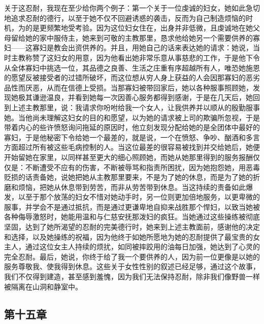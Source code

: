 \par

关于这忍耐，我现在至少给你两个例子：第一个关于一位虔诚的妇女，她如此急切地追求忍耐的德行，以至于她不仅不回避诱惑的袭击，反而为自己制造烦恼的时机，为的是更频繁地受考验。因为这位妇女住在，出身并非低微，且虔诚地在她父母留给她的家中服侍主，她来到可敬的主教那里，恳求他给她另一个需要供养的寡妇——这寡妇是教会出资供养的。并且，用她自己的话来表达她的请求：她说，当时主教称赞了这妇女的用意，因为他看出她非常乐意从事慈悲的工作，于是他下令从全体寡妇中挑选一位，其品德之良善、生活之庄重有序超越所有人，唯恐她施恩的愿望反被接受者的过错所破坏，而这位想从穷人身上获益的人会因那寡妇的恶劣品性而厌恶，从而在信德上受损。当那寡妇被带回家后，她以各种服事照顾她，发现她极其谦逊温良，并看到她每一次因善心服务都得到感谢，于是在几天后，她回到上述主教那里，说：我请求你吩咐给我一个女人，让我供养并以顺从的殷勤服事她。当他尚未理解这妇女的目的和愿望，以为她的请求被上司的欺骗所忽视，于是带着内心的些许愤怒询问拖延的原因时，他立刻发现分配给她的是全团体中最好的寡妇，于是他秘密下令给她一个最差的，就是说，一个在愤怒、争吵、酗酒和多言方面超过所有被这些毛病控制的人。当这位最差的很容易被找到并交给她后，她便开始留她在家里，以同样甚至更大的细心照顾她，而她从她那里得到的服务报酬仅仅是：不断遭受不应有的伤害，不断被辱骂和指责所困扰，因为她抱怨她，用恶毒贬损的话责备她，说她把她从主教那里要来，不是为了她的休息，而是为了她的折磨和烦恼，把她从休息带到劳苦，而非从劳苦带到休息。当这持续的责备如此爆发，以至于那个放荡的妇女不惜对她动手时，另一位则更加倍地服务，以更卑微的服事，并学会不是通过抵抗，而是通过更谦卑地自抑来战胜那个悍妇，以致当她被各种侮辱激怒时，她能用温和与仁慈安抚那泼妇的疯狂。当她通过这些操练被彻底坚固，达到了她所渴望的忍耐的完美德行时，她来到上述主教面前，感谢他的决定和选择，以及她操练的祝福，因为他终于如她所愿地为她的忍耐提供了最宝贵的女主人，通过这位女主人持续的烦扰，如同被摔跤用的油每日加强，她达到了心灵的完全忍耐。最后，她说，你终于给了我一个要供养的人，因为前一位更像是以她的服务尊敬我、使我得到休息。这些关于女性性别的叙述已经足够，通过这个故事，我们不仅得到建造，甚至感到羞愧，因为我们无法保持忍耐，除非我们像野兽一样被隔离在山洞和静室中。\par


\subsection{第十五章}

